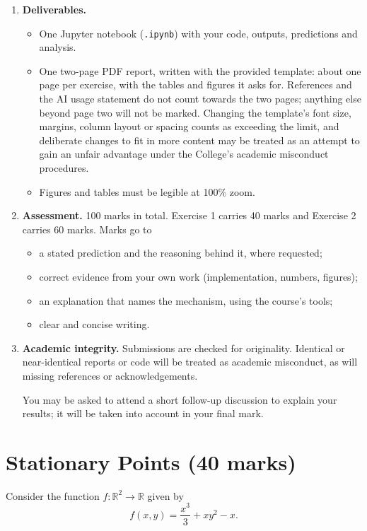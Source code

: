 \documentclass[10pt]{article}
\begin{document}
\begin{enumerate}
\item \textbf{Deliverables.}
\begin{itemize}
\item One Jupyter notebook (\texttt{.ipynb}) with your code, outputs, predictions and analysis.
\item One two-page PDF report, written with the provided template: about one page per exercise, with the tables and figures it asks for. References and the AI usage statement do not count towards the two pages; anything else beyond page two will not be marked. Changing the template's font size, margins, column layout or spacing counts as exceeding the limit, and deliberate changes to fit in more content may be treated as an attempt to gain an unfair advantage under the College's academic misconduct procedures.
\item Figures and tables must be legible at 100\% zoom.
\end{itemize}

\item \textbf{Assessment.} 100 marks in total. Exercise 1 carries 40 marks and Exercise 2 carries 60 marks. Marks go to
\begin{itemize}
\item a stated prediction and the reasoning behind it, where requested;
\item correct evidence from your own work (implementation, numbers, figures);
\item an explanation that names the mechanism, using the course's tools;
\item clear and concise writing.
\end{itemize}

\item \textbf{Academic integrity.} Submissions are checked for originality. Identical or near-identical reports or code will be treated as academic misconduct, as will missing references or acknowledgements.

You may be asked to attend a short follow-up discussion to explain your results; it will be taken into account in your final mark.
\end{enumerate}

\clearpage
\section{Stationary Points (40 marks)}

Consider the function $f\colon\mathbb{R}^2 \to \mathbb{R}$ given by
\[
    f(x,y)=\frac{x^3}{3}+xy^2-x.
\]
\end{document}
